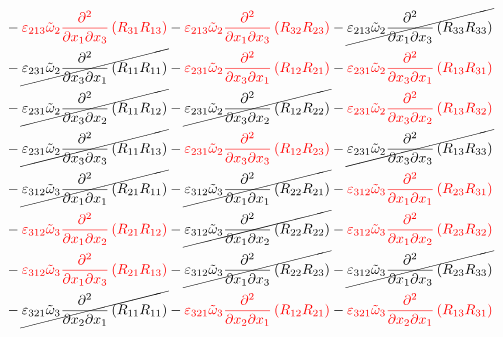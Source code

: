 \begin{equation}
\begin{split}
&		-{\color{red}\varepsilon_{213}\tilde{\omega}_{2}\pdv{}{x_{1}}{x_{3}}\left(R_{31}R_{13}\right)}
		-{\color{red}\varepsilon_{213}\tilde{\omega}_{2}\pdv{}{x_{1}}{x_{3}}\left(R_{32}R_{23}\right)}
		-\cancel{\varepsilon_{213}\tilde{\omega}_{2}\pdv{}{x_{1}}{x_{3}}\left(R_{33}R_{33}\right)}\\
&		-\cancel{\varepsilon_{231}\tilde{\omega}_{2}\pdv{}{x_{3}}{x_{1}}\left(R_{11}R_{11}\right)}
		-{\color{red}\varepsilon_{231}\tilde{\omega}_{2}\pdv{}{x_{3}}{x_{1}}\left(R_{12}R_{21}\right)}
		-{\color{red}\varepsilon_{231}\tilde{\omega}_{2}\pdv{}{x_{3}}{x_{1}}\left(R_{13}R_{31}\right)}\\
&		-\cancel{\varepsilon_{231}\tilde{\omega}_{2}\pdv{}{x_{3}}{x_{2}}\left(R_{11}R_{12}\right)}
		-\cancel{\varepsilon_{231}\tilde{\omega}_{2}\pdv{}{x_{3}}{x_{2}}\left(R_{12}R_{22}\right)}
		-{\color{red}\varepsilon_{231}\tilde{\omega}_{2}\pdv{}{x_{3}}{x_{2}}\left(R_{13}R_{32}\right)}\\
&		-\cancel{\varepsilon_{231}\tilde{\omega}_{2}\pdv{}{x_{3}}{x_{3}}\left(R_{11}R_{13}\right)}
		-{\color{red}\varepsilon_{231}\tilde{\omega}_{2}\pdv{}{x_{3}}{x_{3}}\left(R_{12}R_{23}\right)}
		-\cancel{\varepsilon_{231}\tilde{\omega}_{2}\pdv{}{x_{3}}{x_{3}}\left(R_{13}R_{33}\right)}\\
&		-\cancel{\varepsilon_{312}\tilde{\omega}_{3}\pdv{}{x_{1}}{x_{1}}\left(R_{21}R_{11}\right)}
		-\cancel{\varepsilon_{312}\tilde{\omega}_{3}\pdv{}{x_{1}}{x_{1}}\left(R_{22}R_{21}\right)}
		-{\color{red}\varepsilon_{312}\tilde{\omega}_{3}\pdv{}{x_{1}}{x_{1}}\left(R_{23}R_{31}\right)}\\
&		-{\color{red}\varepsilon_{312}\tilde{\omega}_{3}\pdv{}{x_{1}}{x_{2}}\left(R_{21}R_{12}\right)}
		-\cancel{\varepsilon_{312}\tilde{\omega}_{3}\pdv{}{x_{1}}{x_{2}}\left(R_{22}R_{22}\right)}
		-{\color{red}\varepsilon_{312}\tilde{\omega}_{3}\pdv{}{x_{1}}{x_{2}}\left(R_{23}R_{32}\right)}\\
&		-{\color{red}\varepsilon_{312}\tilde{\omega}_{3}\pdv{}{x_{1}}{x_{3}}\left(R_{21}R_{13}\right)}
		-\cancel{\varepsilon_{312}\tilde{\omega}_{3}\pdv{}{x_{1}}{x_{3}}\left(R_{22}R_{23}\right)}
		-\cancel{\varepsilon_{312}\tilde{\omega}_{3}\pdv{}{x_{1}}{x_{3}}\left(R_{23}R_{33}\right)}\\
&		-\cancel{\varepsilon_{321}\tilde{\omega}_{3}\pdv{}{x_{2}}{x_{1}}\left(R_{11}R_{11}\right)}
		-{\color{red}\varepsilon_{321}\tilde{\omega}_{3}\pdv{}{x_{2}}{x_{1}}\left(R_{12}R_{21}\right)}
		-{\color{red}\varepsilon_{321}\tilde{\omega}_{3}\pdv{}{x_{2}}{x_{1}}\left(R_{13}R_{31}\right)}\\

\end{split}
\end{equation}
